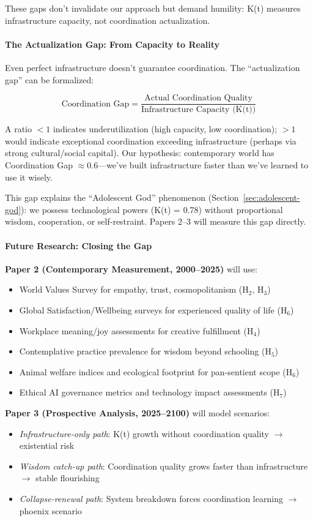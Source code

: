 \documentclass[11pt]{article}
\begin{document}
These gaps don't invalidate our approach but demand humility: K(t) measures
infrastructure capacity, not coordination actualization.

\paragraph{The Actualization Gap: From Capacity to Reality}

Even perfect infrastructure doesn't guarantee coordination. The ``actualization
gap'' can be formalized:

\[
\text{Coordination Gap} = \frac{\text{Actual Coordination Quality}}{\text{Infrastructure Capacity (K(t))}}
\]

A ratio $< 1$ indicates underutilization (high capacity, low coordination);
$> 1$ would indicate exceptional coordination exceeding infrastructure (perhaps
via strong cultural/social capital). Our hypothesis: contemporary world has
Coordination Gap $\approx 0.6$---we've built infrastructure faster than we've
learned to use it wisely.

This gap explains the ``Adolescent God'' phenomenon (Section~\ref{sec:adolescent-god}):
we possess technological powers (K(t) = 0.78) without proportional wisdom,
cooperation, or self-restraint. Papers 2--3 will measure this gap directly.

\paragraph{Future Research: Closing the Gap}

\textbf{Paper 2 (Contemporary Measurement, 2000--2025)} will use:
\begin{itemize}
\item World Values Survey for empathy, trust, cosmopolitanism (H$_2$, H$_3$)
\item Global Satisfaction/Wellbeing surveys for experienced quality of life (H$_6$)
\item Workplace meaning/joy assessments for creative fulfillment (H$_4$)
\item Contemplative practice prevalence for wisdom beyond schooling (H$_5$)
\item Animal welfare indices and ecological footprint for pan-sentient scope (H$_6$)
\item Ethical AI governance metrics and technology impact assessments (H$_7$)
\end{itemize}

\textbf{Paper 3 (Prospective Analysis, 2025--2100)} will model scenarios:
\begin{itemize}
\item \textit{Infrastructure-only path}: K(t) growth without coordination quality
$\rightarrow$ existential risk
\item \textit{Wisdom catch-up path}: Coordination quality grows faster than
infrastructure $\rightarrow$ stable flourishing
\item \textit{Collapse-renewal path}: System breakdown forces coordination
learning $\rightarrow$ phoenix scenario
\end{itemize}
\end{document}
